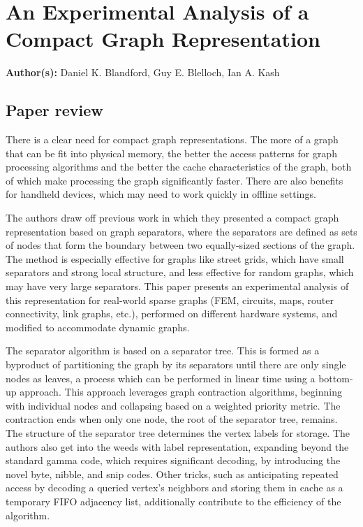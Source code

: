 \section{An Experimental Analysis of a Compact Graph Representation}

\textbf{Author(s):} Daniel K. Blandford, Guy E. Blelloch, Ian A. Kash

\subsection{Paper review}

There is a clear need for compact graph representations. The more of a graph that can be fit into physical memory, the better the access patterns for graph processing algorithms and the better the cache characteristics of the graph, both of which make processing the graph significantly faster. There are also benefits for handheld devices, which may need to work quickly in offline settings. 

The authors draw off previous work in which they presented a compact graph representation based on graph separators, where the separators are defined as sets of nodes that form the boundary between two equally-sized sections of the graph. The method is especially effective for graphs like street grids, which have small separators and strong local structure, and less effective for random graphs, which may have very large separators. This paper presents an experimental analysis of this representation for real-world sparse graphs (FEM, circuits, maps, router connectivity, link graphs, etc.), performed on different hardware systems, and modified to accommodate dynamic graphs.

The separator algorithm is based on a separator tree. This is formed as a byproduct of partitioning the graph by its separators until there are only single nodes as leaves, a process which can be performed in linear time using a bottom-up approach. This approach leverages graph contraction algorithms, beginning with individual nodes and collapsing based on a weighted priority metric. The contraction ends when only one node, the root of the separator tree, remains. The structure of the separator tree determines the vertex labels for storage. The authors also get into the weeds with label representation, expanding beyond the standard gamma code, which requires significant decoding, by introducing the novel byte, nibble, and snip codes. Other tricks, such as anticipating repeated access by decoding a queried vertex's neighbors and storing them in cache as a temporary FIFO adjacency list, additionally contribute to the efficiency of the algorithm.

